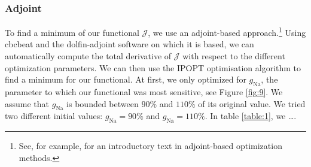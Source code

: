 \documentclass{article}
\begin{document}
\subsubsection{Adjoint} \label{Adjoint}
To find a minimum of our functional $\mathcal{J}$, we use an adjoint-based approach.\footnote{See, for example, \cite{Gunzburger} for an introductory text in adjoint-based optimization methods.} Using cbcbeat and the dolfin-adjoint software on which it is based, we can automatically compute the total derivative of $\mathcal{J}$ with respect to the different optimization parameters. 
We can then use the IPOPT optimisation algorithm\cite{Wachter2006} to find a minimum for our functional. At first, we only optimized for $g_{\mathrm{Na}}$, the parameter to which our functional was most sensitive, see Figure \ref{fig:9}. We assume that  $g_{\mathrm{Na}}$ is bounded between $90\%$ and $110\%$ of its original value. We tried two different initial values: $g_{\mathrm{Na}}=90\%$ and $g_{\mathrm{Na}}=110\%$. In table \ref{table:1}, we \ldots. 
\begin{table}
\begin{center}
\end{center}
\caption{The values of $\mathcal{J}$ and $g_{\mathrm{Na}}, g_{\mathrm{CaL}}, g_{\mathrm{Kr}}$ and $g_{\mathrm{K1}}$ after each iteration, when optimizing for one of the four parameters at a time. The initial guess is $90\%$ of the original parameter value.}
\label{table:1}
\end{table}
\end{document}
